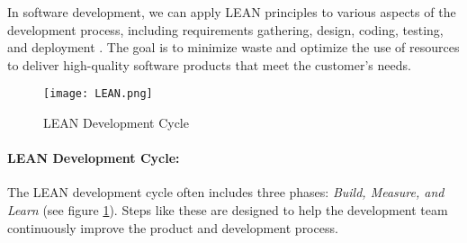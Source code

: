 In software development, we can apply LEAN principles to various aspects of the development process, including requirements gathering, design, coding, testing, and deployment \cite{misc:lean:tutorial}.
The goal is to minimize waste and optimize the use of resources to deliver high-quality software products that meet the customer's needs.
\begin{figure}[htbp!]
  \centering    
  \texttt{[image: LEAN.png]}
  \caption[LEAN Development Cycle]{LEAN Development Cycle\footnotemark[8]}
  \label{fig:background:lean}
\end{figure}

\paragraph{LEAN Development Cycle:} 
The LEAN development cycle often includes three phases: \textit{Build, Measure, and Learn} (see figure \ref{fig:background:lean}). 
Steps like these are designed to help the development team continuously improve the product and development process.\\
